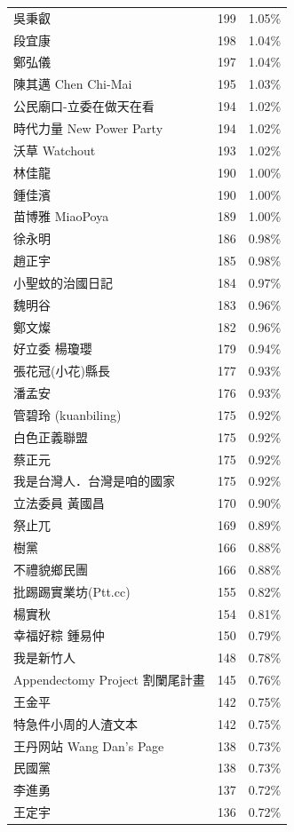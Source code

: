 \documentclass[letterpaper, 10pt, conference]{ieeeconf}   %
\begin{document}
\begin{CJK}{UTF8}{bsmi}
\begin{longtable}[c]{@{}lcc@{}}
吳秉叡 & 199 & 1.05\% \\
段宜康 & 198 & 1.04\% \\
鄭弘儀 & 197 & 1.04\% \\
陳其邁 Chen Chi-Mai & 195 & 1.03\% \\
公民廟口-立委在做天在看 & 194 & 1.02\% \\
時代力量 New Power Party & 194 & 1.02\% \\
沃草 Watchout & 193 & 1.02\% \\
林佳龍 & 190 & 1.00\% \\
鍾佳濱 & 190 & 1.00\% \\
苗博雅 MiaoPoya & 189 & 1.00\% \\
徐永明 & 186 & 0.98\% \\
趙正宇 & 185 & 0.98\% \\
小聖蚊的治國日記 & 184 & 0.97\% \\
魏明谷 & 183 & 0.96\% \\
鄭文燦 & 182 & 0.96\% \\
好立委 楊瓊瓔 & 179 & 0.94\% \\
張花冠(小花)縣長 & 177 & 0.93\% \\
潘孟安 & 176 & 0.93\% \\
管碧玲 (kuanbiling) & 175 & 0.92\% \\
白色正義聯盟 & 175 & 0.92\% \\
蔡正元 & 175 & 0.92\% \\
我是台灣人．台灣是咱的國家 & 175 & 0.92\% \\
立法委員 黃國昌 & 170 & 0.90\% \\
祭止兀 & 169 & 0.89\% \\
樹黨 & 166 & 0.88\% \\
不禮貌鄉民團 & 166 & 0.88\% \\
批踢踢實業坊(Ptt.cc) & 155 & 0.82\% \\
楊實秋 & 154 & 0.81\% \\
幸福好粽 鍾易仲 & 150 & 0.79\% \\
我是新竹人 & 148 & 0.78\% \\
Appendectomy Project 割闌尾計畫 & 145 & 0.76\% \\
王金平 & 142 & 0.75\% \\
特急件小周的人渣文本 & 142 & 0.75\% \\
王丹网站 Wang Dan's Page & 138 & 0.73\% \\
民國黨 & 138 & 0.73\% \\
李進勇 & 137 & 0.72\% \\
王定宇 & 136 & 0.72\% \\

\end{longtable}
\end{CJK}
\end{document}
